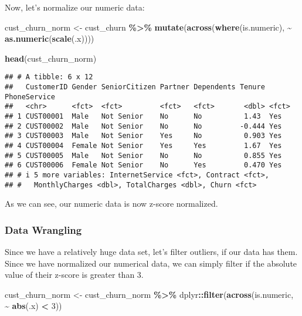 \documentclass[
]{article}
\newenvironment{Shaded}{\begin{snugshade}}{\end{snugshade}}
\newcommand{\DecValTok}[1]{\textcolor[rgb]{0.00,0.00,0.81}{#1}}
\newcommand{\FunctionTok}[1]{\textcolor[rgb]{0.13,0.29,0.53}{\textbf{#1}}}
\newcommand{\NormalTok}[1]{#1}
\newcommand{\OtherTok}[1]{\textcolor[rgb]{0.56,0.35,0.01}{#1}}
\newcommand{\SpecialCharTok}[1]{\textcolor[rgb]{0.81,0.36,0.00}{\textbf{#1}}}
\begin{document}
Now, let's normalize our numeric data:

\begin{Shaded}
\begin{Highlighting}[]
\NormalTok{cust\_churn\_norm }\OtherTok{\textless{}{-}}\NormalTok{ cust\_churn }\SpecialCharTok{\%\textgreater{}\%} \FunctionTok{mutate}\NormalTok{(}\FunctionTok{across}\NormalTok{(}\FunctionTok{where}\NormalTok{(is.numeric), }\SpecialCharTok{\textasciitilde{}} \FunctionTok{as.numeric}\NormalTok{(}\FunctionTok{scale}\NormalTok{(.x))))}

\FunctionTok{head}\NormalTok{(cust\_churn\_norm)}
\end{Highlighting}
\end{Shaded}

\begin{verbatim}
## # A tibble: 6 x 12
##   CustomerID Gender SeniorCitizen Partner Dependents Tenure PhoneService
##   <chr>      <fct>  <fct>         <fct>   <fct>       <dbl> <fct>       
## 1 CUST00001  Male   Not Senior    No      No          1.43  Yes         
## 2 CUST00002  Male   Not Senior    No      No         -0.444 Yes         
## 3 CUST00003  Male   Not Senior    Yes     No          0.903 Yes         
## 4 CUST00004  Female Not Senior    Yes     Yes         1.67  Yes         
## 5 CUST00005  Male   Not Senior    No      No          0.855 Yes         
## 6 CUST00006  Female Not Senior    No      Yes         0.470 Yes         
## # i 5 more variables: InternetService <fct>, Contract <fct>,
## #   MonthlyCharges <dbl>, TotalCharges <dbl>, Churn <fct>
\end{verbatim}

As we can see, our numeric data is now z-score normalized.

\subsubsection{Data Wrangling}\label{data-wrangling}

Since we have a relatively huge data set, let's filter outliers, if our
data has them. Since we have normalized our numerical data, we can
simply filter if the absolute value of their z-score is greater than 3.

\begin{Shaded}
\begin{Highlighting}[]
\NormalTok{cust\_churn\_norm }\OtherTok{\textless{}{-}}\NormalTok{ cust\_churn\_norm }\SpecialCharTok{\%\textgreater{}\%} 
\NormalTok{  dplyr}\SpecialCharTok{::}\FunctionTok{filter}\NormalTok{(}\FunctionTok{across}\NormalTok{(is.numeric, }\SpecialCharTok{\textasciitilde{}} \FunctionTok{abs}\NormalTok{(.x) }\SpecialCharTok{\textless{}} \DecValTok{3}\NormalTok{))}
\end{Highlighting}
\end{Shaded}
\end{document}

